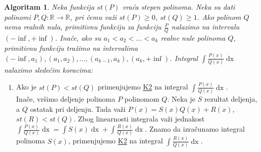 \documentclass{article}
\newtheorem{alg}{Algoritam}[section]
\DeclareMathOperator{\dx}{dx}
\begin{document}
\begin{algbox}
    \begin{alg}
        Neka funkcija $st\left(P\right)$ vraća stepen polinoma.
        Neka su dati polinomi $P, Q: \mathbb{R} \longrightarrow \mathbb{R}$, pri čemu
        važi $st\left(P\right)\geq0$, $st\left(Q\right)\geq1$. Ako polinom $Q$ nema realnih nula, primitivnu funkciju
        za funkciju $\displaystyle\frac{P}{Q}$ nalazimo na intervalu $\left(-\inf, +\inf\right)$. Inače,
        ako su $a_1 < a_2 < \dotsc < a_k$ realne nule polinoma $Q$, primitivnu funkciju
        tražimo na intervalima $\left(-\inf, a_1\right),\left(a_1, a_2\right),\dotsc,\left(a_{k-1},a_k\right),\left(a_k,+\inf\right)$.
        Integral $\displaystyle\int\frac{P\left(x\right)}{Q\left(x\right)}\dx$ nalazimo sledećim koracima:
    \end{alg}
    \begin{enumerate}[label=\text{K\arabic*:}]
        \item\label{algoritam_1_K1}
              Ako je $st\left(P\right) < st\left(Q\right)$ primenjujemo \hyperref[algoritam_1_K2]{K2} na integral $\displaystyle\int \frac{P\left(x\right)}{Q\left(x\right)}\dx$.\\
              Inače, vršimo deljenje polinoma $P$ polinomom $Q$.
              Neka je $S$ rezultat deljenja, a $Q$ ostatak pri deljenju.
              Tada važi $P\left(x\right) = S\left(x\right)Q\left(x\right) + R\left(x\right)$, $st\left(R\right)<st\left(Q\right)$.
              Zbog linearnosti integrala važi jednakost $\displaystyle\int\frac{P\left(x\right)}{Q\left(x\right)}\dx = \int S\left(x\right)\dx + \int\frac{R\left(x\right)}{Q\left(x\right)}\dx$.
              Znamo da izračunamo integral polinoma $S\left(x\right)$, primenjujemo \hyperref[algoritam_1_K2]{K2}
              na integral $\displaystyle\int \frac{R\left(x\right)}{Q\left(x\right)}\dx$.


\end{enumerate}
\end{algbox}
\end{document}
